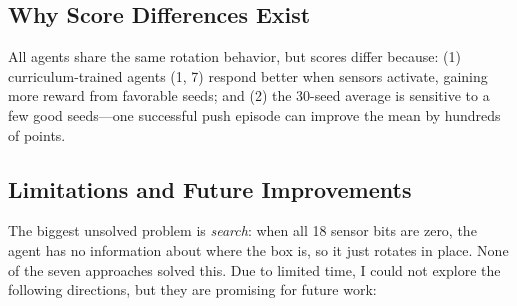 \documentclass[10.5pt, oneside]{article}
\begin{document}
\subsection{Why Score Differences Exist}

All agents share the same rotation behavior, but scores differ because: (1) curriculum-trained agents (1, 7) respond better when sensors activate, gaining more reward from favorable seeds; and (2) the 30-seed average is sensitive to a few good seeds---one successful push episode can improve the mean by hundreds of points.

\subsection{Limitations and Future Improvements}

The biggest unsolved problem is \textit{search}: when all 18 sensor bits are zero, the agent has no information about where the box is, so it just rotates in place. None of the seven approaches solved this. Due to limited time, I could not explore the following directions, but they are promising for future work:
\end{document}
